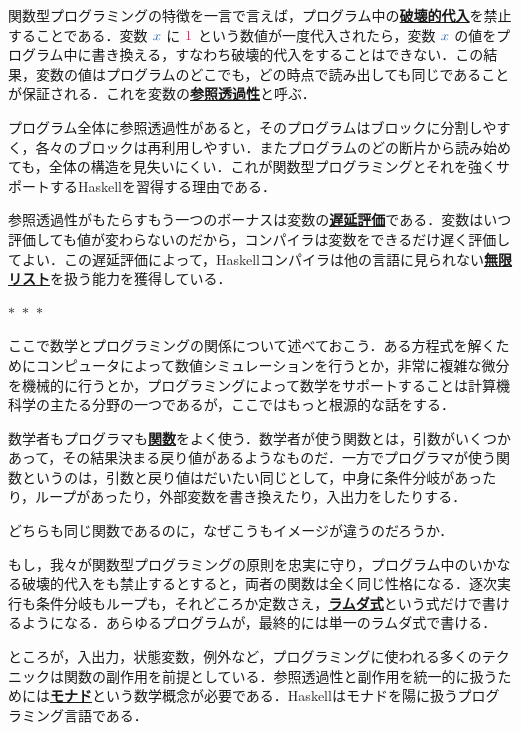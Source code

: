 \documentclass[a5paper,twoside,fleqn,draft]{jsbook}
\def\constantColor{WildStrawberry}
\def\varColor{NavyBlue}
\newcommand{\separator}{\begin{center}$*$~$*$~$*$\end{center}}
\newcommand{\programminglanguage}[1]{\textsf{#1}}
\newcommand{\haskell}{\programminglanguage{Haskell}}
\newcommand{\keyword}[1]{{\underline{\textbf{#1}}}}
\newcommand{\mConstant}[1]{\textcolor{\constantColor}{#1}}
\newcommand{\mOneNumber}{{\mConstant{1}}}
\newcommand{\mVar}[1]{\textcolor{\varColor}{#1}}
\newcommand{\mXVar}{\mVar{x}}
\begin{document}
関数型プログラミングの特徴を一言で言えば，プログラム中の\keyword{破壊的代入}を禁止することである．変数 $\mXVar$ に $\mOneNumber$ という数値が一度代入されたら，変数 $\mXVar$ の値をプログラム中に書き換える，すなわち破壊的代入をすることはできない．この結果，変数の値はプログラムのどこでも，どの時点で読み出しても同じであることが保証される．これを変数の\keyword{参照透過性}と呼ぶ．

プログラム全体に参照透過性があると，そのプログラムはブロックに分割しやすく，各々のブロックは再利用しやすい．またプログラムのどの断片から読み始めても，全体の構造を見失いにくい．これが関数型プログラミングとそれを強くサポートする\haskell を習得する理由である．

参照透過性がもたらすもう一つのボーナスは変数の\keyword{遅延評価}である．変数はいつ評価しても値が変わらないのだから，コンパイラは変数をできるだけ遅く評価してよい．この遅延評価によって，\haskell コンパイラは他の言語に見られない\keyword{無限リスト}を扱う能力を獲得している．

\separator

ここで数学とプログラミングの関係について述べておこう．ある方程式を解くためにコンピュータによって数値シミュレーションを行うとか，非常に複雑な微分を機械的に行うとか，プログラミングによって数学をサポートすることは計算機科学の主たる分野の一つであるが，ここではもっと根源的な話をする．

数学者もプログラマも\keyword{関数}をよく使う．数学者が使う関数とは，引数がいくつかあって，その結果決まる戻り値があるようなものだ．一方でプログラマが使う関数というのは，引数と戻り値はだいたい同じとして，中身に条件分岐があったり，ループがあったり，外部変数を書き換えたり，入出力をしたりする．

どちらも同じ関数であるのに，なぜこうもイメージが違うのだろうか．

もし，我々が関数型プログラミングの原則を忠実に守り，プログラム中のいかなる破壊的代入をも禁止するとすると，両者の関数は全く同じ性格になる．逐次実行も条件分岐もループも，それどころか定数さえ，\keyword{ラムダ式}という式だけで書けるようになる．あらゆるプログラムが，最終的には単一のラムダ式で書ける．

ところが，入出力，状態変数，例外など，プログラミングに使われる多くのテクニックは関数の副作用を前提としている．参照透過性と副作用を統一的に扱うためには\keyword{モナド}という数学概念が必要である．\haskell はモナドを陽に扱うプログラミング言語である．


\end{document}
